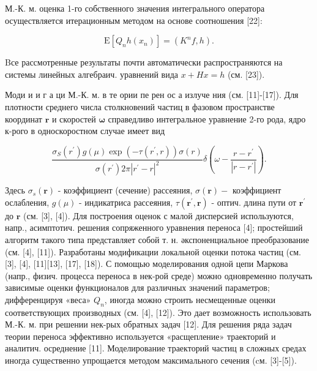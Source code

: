 \documentclass[10pt]{article}
\begin{document}
М.-К. м. оценка 1-го собственного значения интегрального оператора осуществляется итерационным методом на основе соотношения [22]:



\[

\mathrm{E}\left[Q_{n} h\left(x_{n}\right)\right]=\left(K^{n} f, h\right) .

\]



Bсе рассмотренные результаты почти автоматически распространяются на системы линейных алгебраич. уравнений вида $x+H x=h$ (см. [23]).



Моди и и г а ци М.-К. м. в те ории пе рен ос а излуче ния (см. [11]-[17]). Для плотности среднего числа столкновений частиц в фазовом пространстве координат $\boldsymbol{r}$ и скоростей $\boldsymbol{\omega}$ справедливо интегральное уравнение 2-го рода, ядро к-рого в односкоростном случае имеет вид



\[

\frac{\sigma_{S}\left(r^{\prime}\right) g(\mu) \exp \left(-\tau\left(r^{\prime}, r\right)\right) \sigma(r)}{\sigma\left(r^{\prime}\right) 2 \pi\left|r^{\prime}-r\right|^{2}} \delta\left(\omega-\frac{r-r^{\prime}}{\left|r-r^{\prime}\right|}\right) .

\]



Здесь $\sigma_{s}(\boldsymbol{r})$ - коэффициент (сечение) рассеяния, $\sigma(\boldsymbol{r})-$ коэффициент ослабления, $g(\mu)$ - индикатриса рассеяния, $\tau\left(\boldsymbol{r}^{\prime}, \boldsymbol{r}\right)$ - оптич. длина пути от $\boldsymbol{r}^{\prime}$ до $\boldsymbol{r}$ (см. [3], [4]). Для построения оценок с малой дисперсией используются, напр., асимптотич. решения сопряженного уравнения переноса [4]; простейший алгоритм такого типа представляет собой т. н. әкспоненциальное преобразование (см. [4], [11]). Разработаны модификации локальной оценки потока частиц (см. [3], [4], [11][13], [17], [18]). С помощью моделирования одной цепи Маркова (напр., физич. процесса переноса в нек-рой среде) можно одновременно получать зависимые оценки функционалов для различных значений параметров; дифференцируя «веса» $Q_{n}$, иногда можно строить несмещенные оценки соответствующих производных (см. [4], [12]). Это дает возможность использовать М.-К. м. при решении нек-рых обратных задач [12]. Для решения ряда задач теории переноса эффективно используется «расщепление» траекторий и аналитич. осреднение [11]. Моделирование траекторий частиц в сложных средах иногда существенно упрощается методом максимального сечения (cм. [3]-[5]).
\end{document}
